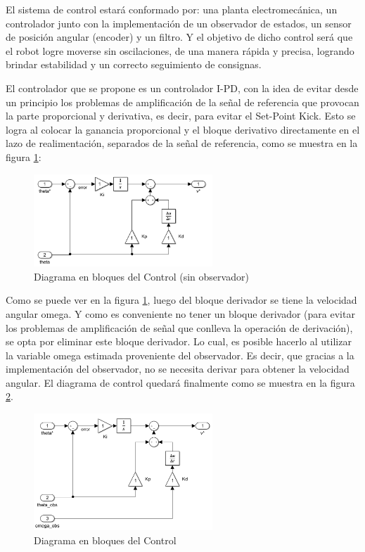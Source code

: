\documentclass{article}
\begin{document}
El sistema de control estará conformado por: una planta electromecánica, un controlador junto con la implementación de un observador de estados, un sensor de posición angular (encoder) y un filtro. Y el objetivo de dicho control será que el robot logre moverse sin oscilaciones, de una manera rápida y precisa, logrando brindar estabilidad y un correcto seguimiento de consignas.

El controlador que se propone es un controlador I-PD, con la idea de evitar desde un principio los problemas de amplificación de la señal de referencia que provocan la parte proporcional y derivativa, es decir, para evitar el Set-Point Kick. Esto se logra al colocar la ganancia proporcional y el bloque derivativo directamente en el lazo de realimentación, separados de la señal de referencia, como se muestra en la figura \ref{fig:Diagrama en bloques del Control (sin observador)}:

\begin{figure}[H]
    \centering
    \includegraphics[width=0.60\textwidth]{Diagrama en bloques del Control (sin observador)}
    \caption{Diagrama en bloques del Control (sin observador)}
    \label{fig:Diagrama en bloques del Control (sin observador)}
\end{figure}

Como se puede ver en la figura \ref{fig:Diagrama en bloques del Control (sin observador)}, luego del bloque derivador se tiene la velocidad angular omega. Y como es conveniente no tener un bloque derivador (para evitar los problemas de amplificación de señal que conlleva la operación de derivación), se opta por eliminar este bloque derivador. Lo cual, es posible hacerlo al utilizar la variable omega estimada proveniente del observador. Es decir, que gracias a la implementación del observador, no se necesita derivar para obtener la velocidad angular. El diagrama de control quedará finalmente como se muestra en la figura \ref{fig:Diagrama en bloques del Control}.

\begin{figure}[H]
    \centering
    \includegraphics[width=0.60\textwidth]{Diagrama en bloques del Control}
    \caption{Diagrama en bloques del Control}
    \label{fig:Diagrama en bloques del Control}
\end{figure}
\end{document}
